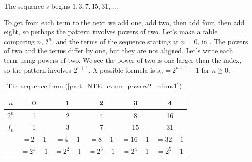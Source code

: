 \begin{exam}
\begin{apart}
            \item \label{part_NTE_exam_powers2_minus1} The sequence $s$ begins $1, 3, 7, 15, 31, \ldots$.     
                \begin{soln}
                    To get from each term to the next we add one, add two, then add four, then add eight, so perhaps the pattern involves powers of two.  Let's make a table comparing $n$, $2^n$, and the terms of the sequence starting at $n=0$, in . The powers of two and the terms differ by one, but they are not aligned.  Let's write each term using powers of two. We see the power of two is one larger than the index, so the pattern involves $2^{n+1}$.  A possible formula is $s_n = 2^{n+1}-1$ for $n \ge 0$.
                \end{soln} 
                 \begin{table}[hbtp]
                    \centering
                    \begin{tabular}{c|c|c| c|c|c}
                        $n$ & 0 & 1 & 2 & 3 & 4   \\ \hline
                        $2^n$ & 1 & 2 & 4 & 8 & 16\\ \hline
                        $f_n$ & 1 & 3 & 7 & 15 & 31\\ 
                        & $=2-1$ & $=4-1$ & $=8-1$ & $=16-1$ & $=32-1$ \\
                        & $=2^1-1$ & $=2^2-1$ & $=2^3-1$ & $=2^4-1$ & $=2^5-1$
                    \end{tabular}
                    \caption{The sequence from  (\ref{part_NTE_exam_powers2_minus1}).}
                    \label{tab_NTE_exam_powers2_minus1}
                \end{table}


\end{apart}
\end{exam}
